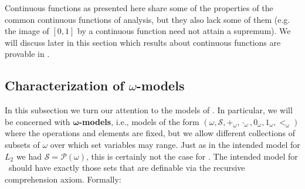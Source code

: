 \documentclass[../main.tex]{memoir}
\begin{document}
Continuous functions as presented here share some of the properties of the common continuous functions of analysis, but they also lack some of them (e.g. the image of $[0, 1]$ by a continuous function need not attain a supremum). We will discuss later in this section which results about continuous functions are provable in \rca.

\subsection{Characterization of $\omega$-models}

In this subsection we turn our attention to the models of \rca. In particular, we will be concerned with $\mathbf{\omega}$\textbf{-models}, i.e., models of the form $(\omega, \mathcal{S}, +_{\omega}, \cdot_{\omega}, 0_{\omega}, 1_{\omega}, <_{\omega})$ where the operations and elements are fixed, but we allow different collections of subsets of $\omega$ over which set variables may range. Just as in the intended model for $L_2$ we had $\mathcal{S} = \mathcal{P}(\omega)$, this is certainly not the case for \rca. The intended model for \rca\ should have exactly those sets that are definable via the recursive comprehension axiom. Formally:
\end{document}

